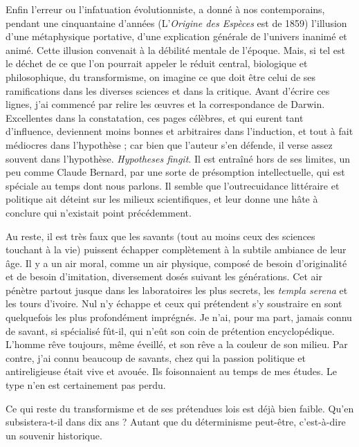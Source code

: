 \documentclass[french,twoside]{book} %
\begin{document}
Enfin l’erreur ou l’infatuation évolutionniste, a donné à nos contemporains, pendant une cinquantaine d’années (L’{\itshape Origine des Espèces} est de 1859) l’illusion d’une métaphysique portative, d’une explication générale de l’univers inanimé et animé. Cette illusion convenait à la débilité mentale de l’époque. Mais, si tel est le déchet de ce que l’on pourrait appeler le réduit central, biologique et philosophique, du transformisme, on imagine ce que doit être celui de ses ramifications dans les diverses sciences et dans la critique. Avant d’écrire ces lignes, j’ai commencé par relire les œuvres et la correspondance de Darwin. Excellentes dans la constatation, ces pages célèbres, et qui eurent tant d’influence, deviennent moins bonnes et arbitraires dans l’induction, et tout à fait médiocres dans l’hypothèse ; car bien que l’auteur s’en défende, il verse assez souvent dans l’hypothèse. {\itshape Hypotheses fingit}. Il est entraîné hors de ses limites, un peu comme Claude Bernard, par une sorte de présomption intellectuelle, qui est spéciale au temps dont nous parlons. Il semble que l’outrecuidance littéraire et politique ait déteint sur les milieux scientifiques, et leur donne une hâte à conclure qui n’existait point précédemment.\par
Au reste, il est très faux que les savants (tout au moins ceux des sciences touchant à la vie) puissent échapper complètement à la subtile ambiance de leur âge. Il y a un air moral, comme un air physique, composé de besoin d’originalité et de besoin d’imitation, diversement dosés suivant les générations. Cet air pénètre partout jusque dans les laboratoires les plus secrets, les {\itshape templa serena} et les tours d’ivoire. Nul n’y échappe et ceux qui prétendent s’y soustraire en sont quelquefois les plus profondément imprégnés. Je n’ai, pour ma part, jamais connu de savant, si spécialisé fût-il, qui n’eût son coin de prétention encyclopédique. L’homme rêve toujours, même éveillé, et son rêve a la couleur de son milieu. Par contre, j’ai connu beaucoup de savants, chez qui la passion politique et antireligieuse était vive et avouée. Ils foisonnaient au temps de mes études. Le type n’en est certainement pas perdu.\par
Ce qui reste du transformisme et de ses prétendues lois est déjà bien faible. Qu’en subsistera-t-il dans dix ans ? Autant que du déterminisme peut-être, c’est-à-dire un souvenir historique.\par
\end{document}
